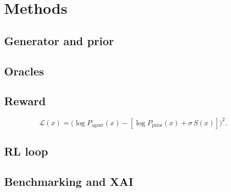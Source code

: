 \documentclass[11pt]{article}
\begin{document}
\section{Methods}

\subsection{Generator and prior}

\subsection{Oracles}

\subsection{Reward}
\begin{equation}
\mathcal{L}(x) = \big(\log P_{\text{agent}}(x) - [\log P_{\text{prior}}(x) + \sigma\, S(x)]\big)^2 .
\end{equation}

\subsection{RL loop}

\subsection{Benchmarking and XAI}
\end{document}
